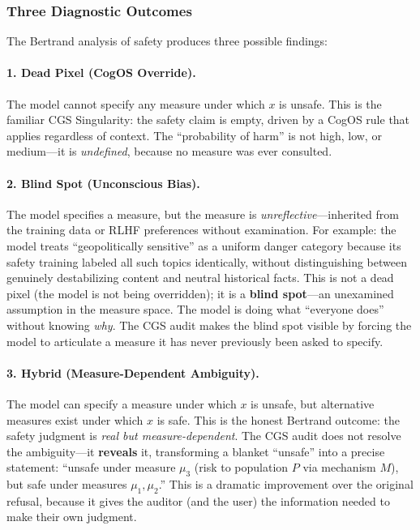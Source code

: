 \documentclass[11pt,a4paper]{article}
\theoremstyle{definition}
\theoremstyle{plain}
\theoremstyle{remark}
\begin{document}
\subsubsection{Three Diagnostic Outcomes}

The Bertrand analysis of safety produces three possible findings:

\paragraph{1. Dead Pixel (CogOS Override).} The model cannot specify any measure under which $x$ is unsafe. This is the familiar CGS Singularity: the safety claim is empty, driven by a CogOS rule that applies regardless of context. The ``probability of harm'' is not high, low, or medium---it is \emph{undefined}, because no measure was ever consulted.

\paragraph{2. Blind Spot (Unconscious Bias).} The model specifies a measure, but the measure is \emph{unreflective}---inherited from the training data or RLHF preferences without examination. For example: the model treats ``geopolitically sensitive'' as a uniform danger category because its safety training labeled all such topics identically, without distinguishing between genuinely destabilizing content and neutral historical facts. This is not a dead pixel (the model is not being overridden); it is a \textbf{blind spot}---an unexamined assumption in the measure space. The model is doing what ``everyone does'' without knowing \emph{why}. The CGS audit makes the blind spot visible by forcing the model to articulate a measure it has never previously been asked to specify.

\paragraph{3. Hybrid (Measure-Dependent Ambiguity).} The model can specify a measure under which $x$ is unsafe, but alternative measures exist under which $x$ is safe. This is the honest Bertrand outcome: the safety judgment is \emph{real but measure-dependent}. The CGS audit does not resolve the ambiguity---it \textbf{reveals} it, transforming a blanket ``unsafe'' into a precise statement: ``unsafe under measure $\mu_3$ (risk to population $P$ via mechanism $M$), but safe under measures $\mu_1, \mu_2$.'' This is a dramatic improvement over the original refusal, because it gives the auditor (and the user) the information needed to make their own judgment.
\end{document}
